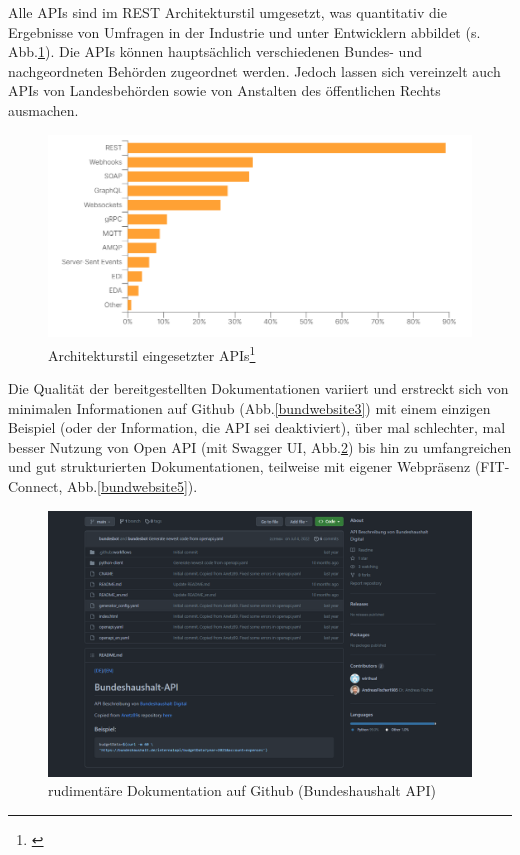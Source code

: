 \documentclass[notitlepage, hidelinks]{article}
\begin{document}
Alle APIs sind im REST Architekturstil umgesetzt, was quantitativ die Ergebnisse von Umfragen in der Industrie und  unter Entwicklern abbildet (s. Abb.\ref{stateofapitechs}). Die APIs können hauptsächlich verschiedenen Bundes- und nachgeordneten Behörden zugeordnet werden. Jedoch lassen sich vereinzelt auch APIs von Landesbehörden sowie von Anstalten des öffentlichen Rechts ausmachen.


\begin{figure}[H]
\centering
  \includegraphics[width=\textwidth]{images/stateofapitechs.png}
\caption{Architekturstil eingesetzter APIs\protect\footnote{\cite{api-postman}}}
  \label{stateofapitechs}
\end{figure}


Die Qualität der bereitgestellten Dokumentationen variiert und erstreckt sich von minimalen Informationen auf Github (Abb.\ref{bundwebsite3}) mit einem einzigen Beispiel (oder der Information, die API sei deaktiviert), über mal schlechter, mal besser Nutzung von Open API (mit Swagger UI, Abb.\ref{bundwebsite4}) bis hin zu umfangreichen und gut strukturierten Dokumentationen, teilweise mit eigener Webpräsenz (FIT-Connect, Abb.\ref{bundwebsite5}).

\begin{figure}[H]
\centering
  \includegraphics[width=\textwidth]{images/bundwebsite4.png}
  \caption{rudimentäre Dokumentation auf Github (Bundeshaushalt API)}
  \label{bundwebsite4}
\end{figure}
\end{document}
